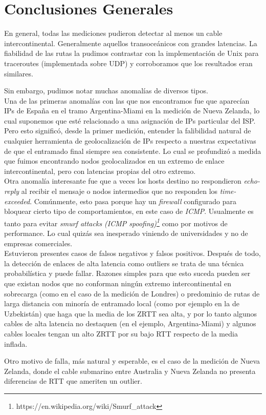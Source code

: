 \section{Conclusiones Generales}
En general, todas las mediciones pudieron detectar al menos un cable intercontinental. Generalmente aquellos transoceánicos con grandes latencias. La fiabilidad de las rutas la pudimos contrastar con la implementación de Unix para traceroutes (implementada sobre UDP) y corroboramos que los resultados eran similares.

Sin embargo, pudimos notar muchas anomalías de diversos tipos.
\\

Una de las primeras anomalías con las que nos encontramos fue que aparecían IPs de España en el tramo Argentina-Miami en la medición de Nueva Zelanda, lo cual suponemos que esté relacionado a una asignación de IPs particular del ISP. Pero esto significó, desde la primer medición, entender la falibilidad natural de cualquier herramienta de geolocalización de IPs respecto a nuestras expectativas de que el entramado final siempre sea consistente. Lo cual se profundizó a medida que fuimos encontrando nodos geolocalizados en un extremo de enlace intercontinental, pero con latencias propias del otro extremo.
\\

Otra anomalía interesante fue que a veces los hosts destino no respondieron \emph{echo-reply} al recibir el mensaje o nodos intermedios que no responden los \emph{time-exceeded}. Comúnmente, esto pasa porque hay un \emph{firewall} configurado para bloquear cierto tipo de comportamientos, en este caso de \emph{ICMP}. Usualmente es tanto para evitar \emph{smurf attacks (ICMP spoofing)\footnote{https://en.wikipedia.org/wiki/Smurf_attack}} como por motivos de performance. Lo cual quizás sea inesperado viniendo de universidades y no de empresas comerciales.
\\

Estuvieron presentes casos de falsos negativos y falsos positivos. Después de todo, la detección de enlaces de alta latencia como outliers se trata de una técnica probabilística y puede fallar. Razones simples para que esto suceda pueden ser que existan nodos que no conforman ningún extremo intercontinental en sobrecarga (como en el caso de la medición de Londres) o predominio de rutas de larga distancia con minoría de entramado local (como por ejemplo en la de Uzbekistán) que haga que la media de los ZRTT sea alta, y por lo tanto algunos cables de alta latencia no destaquen (en el ejemplo, Argentina-Miami) y algunos cables locales tengan un alto ZRTT por su bajo RTT respecto de la media inflada.

Otro motivo de falla, más natural y esperable, es el caso de la medición de Nueva Zelanda, donde el cable submarino entre Australia y Nueva Zelanda no presenta diferencias de RTT que ameriten un outlier.
